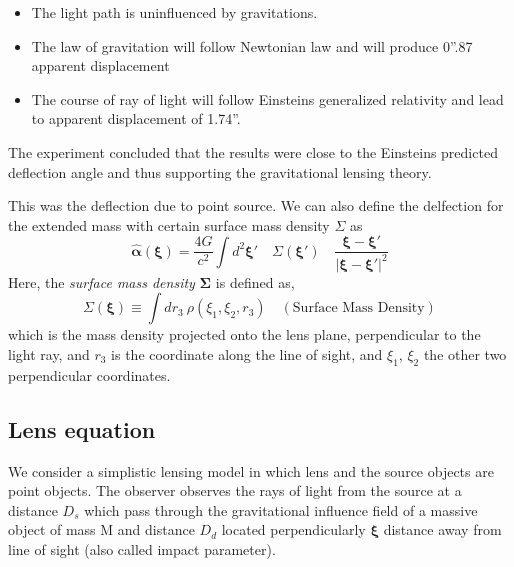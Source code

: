   \begin{itemize}

    \item{The light path is uninfluenced by gravitations.}
    \item{The law of gravitation will follow Newtonian law and will produce
            0''.87 apparent displacement}
    \item{The course of ray of light will follow Einsteins generalized
            relativity and lead to apparent displacement of 1.74''.}
  \end{itemize}
  The experiment concluded that the results were close to the Einsteins predicted
  deflection angle and thus supporting the gravitational lensing theory.

  This was the deflection due to point source. We can also define the delfection
  for the extended mass with certain surface mass density $\Sigma$ as
  \begin{equation}\label{[eq:alphaHat]}
    \hat{\boldsymbol{\alpha}} (\boldsymbol{\xi} ) = \frac{4G}{c^2} \int d^2 \boldsymbol{\xi\prime}\quad  \Sigma (\boldsymbol{\xi\prime}) \quad  \frac{\boldsymbol{\xi} - \boldsymbol{\xi\prime}}{|\boldsymbol{\xi} - \boldsymbol{\xi\prime} |^2}
  \end{equation}
  Here, the \textit{surface mass density} $\boldsymbol{\Sigma}$ is defined as,
  \begin{equation}\label{[eq:surface_mass_density]}
    \boxed{
    \Sigma(\boldsymbol{\xi}) \equiv \int dr_3 \ \rho(\xi_1, \xi_2, r_3)} \quad (\text{Surface Mass Density})
  \end{equation}
  which is the mass density projected onto the lens plane, perpendicular to the
  light ray, and $r_3$ is the coordinate along the line of sight, and
  $\xi_1$, $\xi_2$ the other two perpendicular coordinates.


\subsection{Lens equation}
  We consider a simplistic lensing model in which lens and the source objects are
  point objects. The observer observes the rays of light from the source at a
  distance $D_s$ which pass through the gravitational influence field of a massive
  object of mass M and distance $D_d$ located perpendicularly $\boldsymbol{\xi}$ distance away
  from line of sight (also called impact parameter).


